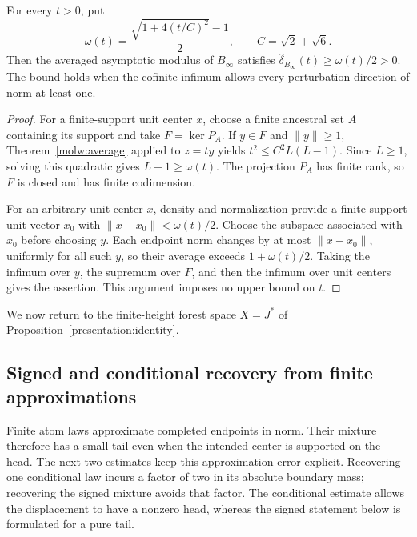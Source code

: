 \begin{corollary}\label{molw:modulus}
For every $t>0$, put
\begin{equation}\label{molw:rho}
 \omega(t)=\frac{\sqrt{1+4(t/C)^2}-1}{2},\qquad C=\sqrt2+\sqrt6.
\end{equation}
Then the averaged asymptotic modulus of $B_\infty$ satisfies
$\widehat\delta_{B_\infty}(t)\ge\omega(t)/2>0$. The bound holds when
the cofinite infimum allows every perturbation direction of norm at
least one.
\end{corollary}

\begin{proof}
For a finite-support unit center $x$, choose a finite ancestral set $A$
containing its support and take $F=\ker P_A$. If $y\in F$ and
$\|y\|\ge1$, Theorem~\ref{molw:average} applied to $z=ty$ yields
$t^2\le C^2 L(L-1)$. Since $L\ge1$, solving this quadratic gives
$L-1\ge\omega(t)$. The projection $P_A$ has finite rank, so $F$ is
closed and has finite codimension.

For an arbitrary unit center $x$, density and normalization provide
a finite-support unit vector $x_0$ with
$\|x-x_0\|<\omega(t)/2$. Choose the subspace associated with $x_0$
before choosing $y$. Each endpoint norm changes by at most
$\|x-x_0\|$, uniformly for all such $y$, so their average exceeds
$1+\omega(t)/2$. Taking the infimum over $y$, the supremum over
$F$, and then the infimum over unit centers gives the assertion.
This argument imposes no upper bound on $t$.
\end{proof}

We now return to the finite-height forest space $X=J^*$ of
Proposition~\ref{presentation:identity}.

\subsection{Signed and conditional recovery from finite approximations}
\label{mola:conditional-section}\label{mol:closed-hull-signed-section}

Finite atom laws approximate completed endpoints in norm. Their mixture
therefore has a small tail even when the intended center is supported
on the head. The next two estimates keep this approximation error
explicit. Recovering one conditional law incurs a factor of two in its
absolute boundary mass; recovering the signed mixture avoids that factor.
The conditional estimate allows the displacement to have a nonzero head,
whereas the signed statement below is formulated for a pure tail.


